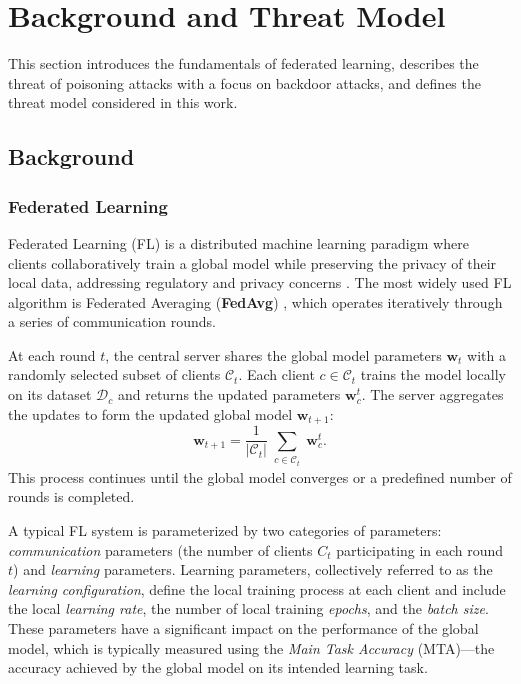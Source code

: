 \section{Background and Threat Model}
\label{sec:background}

This section introduces the fundamentals of federated learning, describes the threat of poisoning attacks with a focus on backdoor attacks, and defines the threat model considered in this work.

\subsection{Background}

\subsubsection{Federated Learning}

Federated Learning (FL) is a distributed machine learning paradigm where clients collaboratively train a global model while preserving the privacy of their local data, addressing regulatory and privacy concerns \citep{mcmahan2017communication}. The most widely used FL algorithm is Federated Averaging (\textbf{FedAvg}) \citep{mcmahan2017communication}, which operates iteratively through a series of communication rounds.  

At each round \(t\), the central server shares the global model parameters \(\mathbf{w}_t\) with a randomly selected subset of clients \(\mathcal{C}_t\). Each client \(c \in \mathcal{C}_t\) trains the model locally on its dataset \(\mathcal{D}_c\) and returns the updated parameters \(\mathbf{w}_c^t\). The server aggregates the updates to form the updated global model \(\mathbf{w}_{t+1}\):
\begin{equation}
    \mathbf{w}_{t+1} = \frac{1}{|\mathcal{C}_t|} \sum_{\substack{c \in \mathcal{C}_t}} \mathbf{w}_c^t.
\end{equation}
This process continues until the global model converges or a predefined number of rounds is completed.  

A typical FL system is parameterized by two categories of parameters: \textit{communication} parameters (\eg the number of clients \(C_t\) participating in each round \(t\)) and \textit{learning} parameters. Learning parameters, collectively referred to as the \textit{learning configuration}, define the local training process at each client and include the local \textit{learning rate}, the number of local training \textit{epochs}, and the \textit{batch size}. These parameters have a significant impact on the performance of the global model, which is typically measured using the \textit{Main Task Accuracy} (MTA)—the accuracy achieved by the global model on its intended learning task.  

